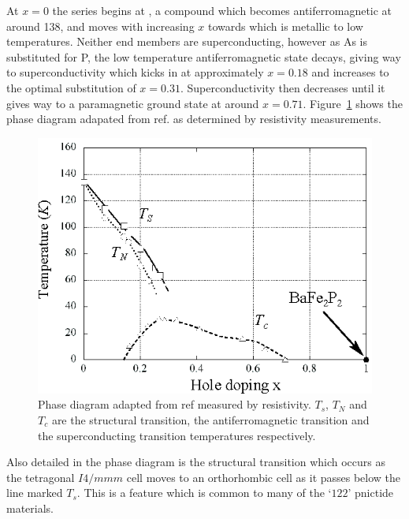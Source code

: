 At $x=0$ the \BaFePAs series begins at \BaFeAs, a compound which becomes antiferromagnetic at around \unit{138}{\kelvin}, and moves with increasing $x$ towards \BaFeP which is metallic to low temperatures. Neither end members are superconducting, however as As is substituted for P, the low temperature antiferromagnetic state decays, giving way to superconductivity which kicks in at approximately $x=0.18$ and increases to the optimal substitution of $x=0.31$. Superconductivity then decreases until it gives way to a paramagnetic ground state at around $x=0.71$. Figure~\ref{Fig:Intro:PhaseDiagram} shows the phase diagram adapated from ref. \cite{Nakai2010a} as determined by resistivity measurements. 
\begin{figure}[htbp]
    \begin{center}
        \includegraphics[scale=1.0]{Chapter-Introduction/Figures/PhaseDiagram/PhaseDiagram}
        \caption{Phase diagram adapted from ref \cite{Nakai2010a} measured by resistivity. $T_s$, $T_N$ and $T_c$ are the structural transition, the antiferromagnetic transition and the superconducting transition temperatures respectively.}
        \label{Fig:Intro:PhaseDiagram}
    \end{center}
\end{figure}
Also detailed in the phase diagram is the structural transition which occurs as the tetragonal $I4/mmm$ cell moves to an orthorhombic cell as it passes below the line marked $T_s$. This is a feature which is common to many of the `$122$' pnictide materials.

